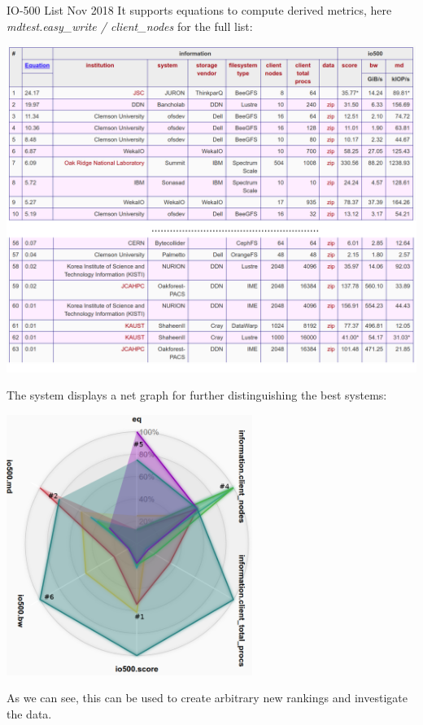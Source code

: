 \documentclass[portrait,a0paper,fontscale=0.4]{baposter}
\begin{document}
\begin{poster}
\begin{posterbox}[name=io500res,column=1,above=bottom,below=io500]{IO-500 List Nov 2018}
It supports equations to compute derived metrics, here \textit{mdtest.easy\_write / client\_nodes} for the full list:

\includegraphics[width=\textwidth]{io500-sorted}

The system displays a net graph for further distinguishing the best systems:

\vspace*{-0.5em}

\begin{center}
\includegraphics[width=0.6\textwidth]{io-500-net}
\end{center}

\vspace*{-0.5em}

As we can see, this can be used to create arbitrary new rankings and investigate the data.


\end{posterbox}
\end{poster}
\end{document}
